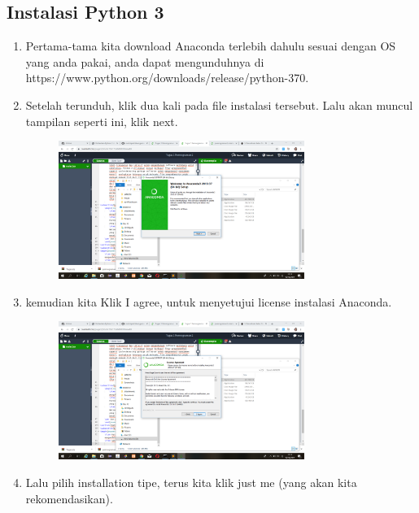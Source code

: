 \documentclass{article}
\begin{document}
\subsection{Instalasi Python 3}
\begin{enumerate}
    \item Pertama-tama kita download Anaconda terlebih dahulu sesuai dengan OS yang anda pakai, anda dapat mengunduhnya di https://www.python.org/downloads/release/python-370.
    \item Setelah terunduh, klik dua kali pada file instalasi tersebut. Lalu akan muncul tampilan seperti ini, klik next.
        \begin{figure}[h]
            \centerline{\includegraphics[width=8cm]{image/1.png}}
        \end{figure}
    \item kemudian kita Klik I agree, untuk menyetujui license instalasi Anaconda.
        \begin{figure}[h]
            \centerline{\includegraphics[width=8cm]{image/2.png}}
        \end{figure}
    \newpage \item Lalu pilih installation tipe,  terus kita klik just me (yang akan kita rekomendasikan).

\end{enumerate}
\end{document}
